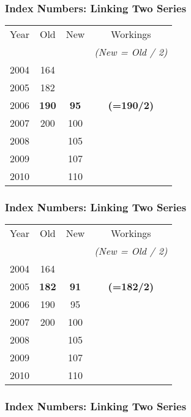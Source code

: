 \frametitle{Index Numbers: Linking Two Series}

\begin{center}
\begin{tabular}
{|c||c|c||c|}
\hline
Year	&\phantom{sp}	Old	\phantom{sp}&\phantom{sp}	New\phantom{sp}	&	Workings	\\ 
	&&	&	\textit{(New = Old / 2)}	\\ 
\hline \hline

2004	&	164	&		&		\\ \hline
2005	&	182	&		&		\\ \hline
2006	&	\textbf{190}	&	\textbf{95}	&	\textbf{(=190/2)}	\\ \hline
2007	&	200	&	100	&		\\ \hline
2008	&		&	105	&		\\ \hline
2009	&		&	107	&		\\ \hline
2010	&		&	110	&		\\ \hline
\end{tabular}  
\end{center}

\frametitle{Index Numbers: Linking Two Series}

\begin{center}
\begin{tabular}
{|c||c|c||c|}
\hline
Year	&\phantom{sp}	Old	\phantom{sp}&\phantom{sp}	New\phantom{sp}	&	Workings	\\ 
	&&	&	\textit{(New = Old / 2)}	\\ 
\hline \hline

2004	&	164	&		&		\\ \hline

2005	&	\textbf{182}	&	\textbf{91}	&	\textbf{(=182/2)}	\\ \hline
2006	&	190	&	95	&		\\ \hline
2007	&	200	&	100	&		\\ \hline
2008	&		&	105	&		\\ \hline
2009	&		&	107	&		\\ \hline
2010	&		&	110	&		\\ \hline
\end{tabular}  
\end{center}


\frametitle{Index Numbers: Linking Two Series}

